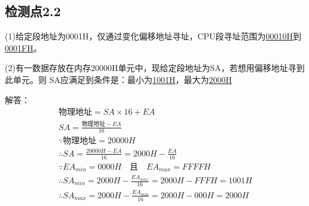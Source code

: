 \documentclass{elegantnote}
\begin{document}
    \subsection*{检测点2.2}
    (1)给定段地址为0001H，仅通过变化偏移地址寻址，CPU段寻址范围为\underline{00010H}到\underline{0001FH}。\par
    (2)有一数据存放在内存20000H单元中，现给定段地址为SA，若想用偏移地址寻到此单元。则
    SA应满足到条件是：最小为\underline{1001H}，最大为\underline{2000H}\par
    解答：
    \begin{gather*}
        \text{物理地址} = SA \times 16 + EA \\
        SA= \frac{\text{物理地址}-EA}{16} \\
        \because\text{物理地址}= 20000H \\
        \therefore SA = \frac{20000H-EA}{16} = 2000H - \frac{EA}{16}\\
        \because EA_{min} = 0000H \text{{ } 且 { }} EA_{max} = FFFFH\\
        \therefore SA_{min} = 2000H - \frac{EA_{max}}{16} = 2000H - FFFH = 1001H\\
        \therefore SA_{max} = 2000H - \frac{EA_{min}}{16} = 2000H - 000H = 2000H
    \end{gather*}\par
\end{document}
